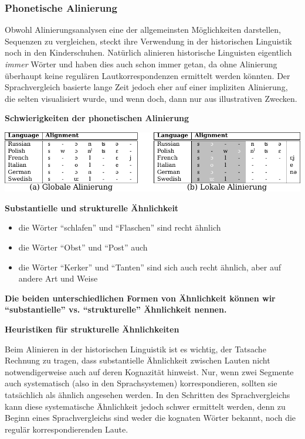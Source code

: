 \subsubsection{\texorpdfstring{{Phonetische
Alinierung}}{Phonetische Alinierung}}

Obwohl Alinierungsanalysen eine der allgemeinsten Möglichkeiten
darstellen, Sequenzen zu vergleichen, steckt ihre Verwendung in der
historischen Linguistik noch in den Kinderschuhen. Natürlich alinieren
historische Linguisten eigentlich \emph{immer} Wörter und haben dies
auch schon immer getan, da ohne Alinierung überhaupt keine regulären
Lautkorrespondenzen ermittelt werden könnten. Der Sprachvergleich
basierte lange Zeit jedoch eher auf einer impliziten Alinierung, die
selten visualisiert wurde, und wenn doch, dann nur aus illustrativen
Zwecken.



\par\noindent\textbf{Schwierigkeiten der phonetischen Alinierung}

\includegraphics[width=\textwidth]{img/phonalign.pdf}



\par\noindent\textbf{Substantielle und strukturelle Ähnlichkeit}

\begin{itemize}
\itemsep1pt\parskip0pt
\item
  die Wörter ``schlafen'' und ``Flaschen'' sind recht ähnlich
\item
  die Wörter ``Obst'' und ``Post'' auch
\item
  die Wörter ``Kerker'' und ``Tanten'' sind sich auch recht ähnlich,
  aber auf andere Art und Weise
\end{itemize}

\par\noindent\textbf{Die beiden unterschiedlichen Formen von Ähnlichkeit können wir
``substantielle'' vs. ``strukturelle'' Ähnlichkeit nennen.}



\par\noindent\textbf{Heuristiken für strukturelle Ähnlichkeiten}

Beim Alinieren in der historischen Linguistik ist es wichtig, der
Tatsache Rechnung zu tragen, dass substantielle Ähnlichkeit zwischen
Lauten nicht notwendigerweise auch auf deren Kognazität hinweist. Nur,
wenn zwei Segmente auch systematisch (also in den Sprachsystemen)
korrespondieren, sollten sie tatsächlich als ähnlich angesehen werden.
In den Schritten des Sprachvergleichs kann diese systematische
Ähnlichkeit jedoch schwer ermittelt werden, denn zu Beginn eines
Sprachvergleichs sind weder die kognaten Wörter bekannt, noch die
regulär korrespondierenden Laute.



